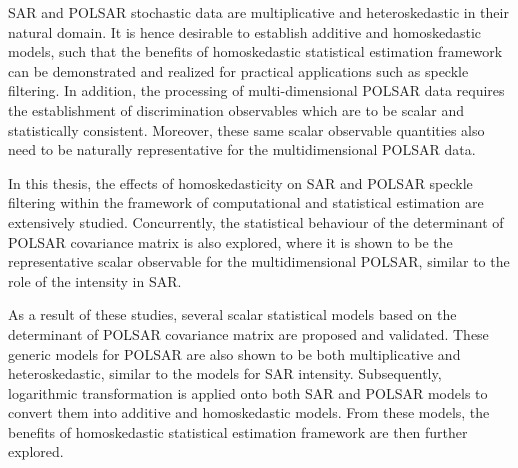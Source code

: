 

\begin{abstracts}        %
{}

SAR and POLSAR stochastic data are multiplicative and heteroskedastic in their natural domain.
It is hence desirable to establish additive and homoskedastic models,
  such that the benefits of homoskedastic statistical estimation framework can be demonstrated and realized for practical applications such as speckle filtering.
In addition, the processing of multi-dimensional POLSAR data requires the establishment of discrimination observables
  which are to be scalar and statistically consistent.
Moreover, these same scalar observable quantities also need to be naturally representative for the multidimensional POLSAR data.

In this thesis, the effects of homoskedasticity on SAR and POLSAR speckle filtering within the framework of computational and statistical estimation are extensively studied. 
Concurrently, the statistical behaviour of the determinant of POLSAR covariance matrix is also explored,
  where it is shown to be the representative scalar observable for the multidimensional POLSAR, similar to the role of the intensity in SAR.

As a result of these studies, several scalar statistical models based on the determinant of POLSAR covariance matrix are proposed and validated.
These generic models for POLSAR are also shown to be both multiplicative and heteroskedastic, similar to the models for SAR intensity. 
Subsequently, logarithmic transformation is applied onto both SAR and POLSAR models
  to convert them into additive and homoskedastic models.
From these models, the benefits of homoskedastic statistical estimation framework are then further explored.


\end{abstracts}
